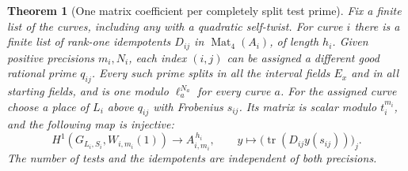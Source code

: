 \documentclass[a4paper,11pt]{article}
\newtheorem{theorem}[proposition]{Theorem}
\theoremstyle{definition}
\theoremstyle{remark}
\numberwithin{equation}{section}
\begin{document}
\begin{theorem}[One matrix coefficient per completely split test prime]
\leavevmode\label{thm:splitprojectors599}
Fix a finite list of the curves, including any with a
quadratic self-twist. For curve \(i\) there is a finite
list of rank-one idempotents \(D_{ij}\) in
\(\operatorname{Mat}_4(A_i)\), of length \(h_i\). Given
positive precisions \(m_i,N_i\), each index \((i,j)\)
can be assigned a different good rational prime \(q_{ij}\).
Every such prime splits in all the interval fields \(E_x\)
and in all starting fields, and is one modulo
\(\ell_a^{N_a}\) for every curve \(a\). For the assigned
curve choose a place of \(L_i\) above \(q_{ij}\) with
Frobenius \(s_{ij}\). Its matrix is scalar modulo
\(t_i^{m_i}\), and the following map is injective:
\[
 H^1(G_{L_i,S_i},W_{i,m_i}(1))
   \longrightarrow A_{i,m_i}^{\,h_i},\qquad
 y\longmapsto \bigl(\operatorname{tr}(D_{ij}y(s_{ij}))\bigr)_j .
\]
The number of tests and the idempotents are independent
of both precisions.
\end{theorem}
\end{document}
